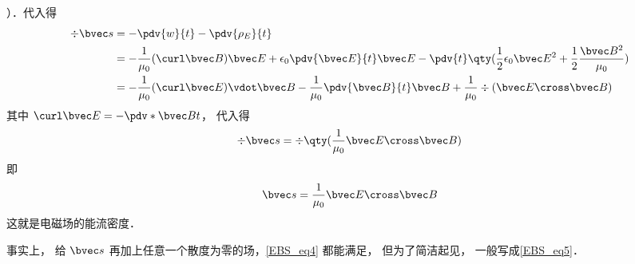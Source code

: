 ）．代入得
\begin{equation}
\begin{aligned}
\div \bvec s &=  - \pdv{w}{t} - \pdv{\rho_E}{t}\\
&= -\frac{1}{\mu_0} (\curl \bvec B)\bvec E + \epsilon_0 \pdv{\bvec E}{t} \bvec E - \pdv{t} \qty(\frac12 \epsilon_0 \bvec E^2 + \frac12 \frac{\bvec B^2}{\mu_0})\\
&=  - \frac{1}{\mu_0} (\curl \bvec E) \vdot \bvec B - \frac{1}{\mu_0}\pdv{\bvec B}{t} \bvec B + \frac{1}{\mu_0}\div (\bvec E \cross \bvec B)
\end{aligned}
\end{equation} 
其中 $\curl \bvec E =  -\pdv*{\bvec B}{t}$， 代入得
\begin{equation}\label{EBS_eq4}
\div \bvec s = \div \qty(\frac{1}{\mu_0}\bvec E \cross \bvec B)
\end{equation} 
即
\begin{equation}\label{EBS_eq5}
\bvec s = \frac{1}{\mu_0}\bvec E \cross \bvec B
\end{equation} 
这就是电磁场的能流密度．

事实上， 给 $\bvec s$ 再加上任意一个散度为零的场，\autoref{EBS_eq4} 都能满足， 但为了简洁起见， 一般写成\autoref{EBS_eq5}． 





